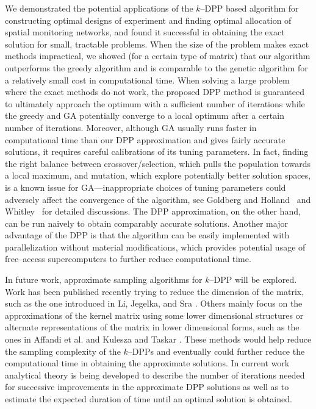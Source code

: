 \documentclass[]{interact}
\theoremstyle{plain}%
\theoremstyle{definition}
\theoremstyle{remark}
\begin{document}
We demonstrated the potential applications of the $k$--DPP based algorithm for constructing optimal designs of experiment and finding optimal allocation of spatial monitoring networks, and found it successful in obtaining the exact solution for small, tractable problems. When the size of the problem makes exact methods impractical, we showed (for a certain type of matrix) that our algorithm outperforms the greedy algorithm and is comparable to the genetic algorithm for a relatively small cost in computational time. When solving a large problem where the exact methods do not work, the proposed DPP method is guaranteed to ultimately approach the optimum with a sufficient number of iterations while the greedy and GA potentially converge to a local optimum after a certain number of iterations. Moreover, although GA usually runs faster in computational time than our DPP approximation and gives fairly accurate solutions, it requires careful calibrations of its tuning parameters. In fact, finding the right balance between crossover/selection, which pulls the population towards a local maximum, and mutation, which explore potentially better solution spaces, is a known issue for GA---inappropriate choices of tuning parameters could adversely affect the convergence of the algorithm, see Goldberg and Holland~\cite{Goldberg} and Whitley~\cite{Whitley} for detailed discussions. The DPP approximation, on the other hand, can be run naively to obtain comparably accurate solutions. Another major advantage of the DPP is that the algorithm can be easily implemented with parallelization without material modifications, which provides potential usage of free--access supercomputers to further reduce computational time.

In future work, approximate sampling algorithms for $k$--DPP will be explored. Work has been published recently trying to reduce the dimension of the matrix, such as the one introduced in Li, Jegelka, and Sra \cite{Li}. Others mainly focus on the approximations of the kernel matrix using some lower dimensional structures or alternate representations of the matrix in lower dimensional forms, such as the ones in Affandi et al. \cite{Affandi1} and Kulesza and Taskar \cite{Kulesza}. These methods would help reduce the sampling complexity of the $k$--DPPs and eventually could further reduce the computational time in obtaining the approximate solutions. In current work analytical theory is being developed to describe the number of iterations needed for successive improvements in the approximate DPP solutions as well as to estimate the expected duration of time until an optimal solution is obtained.  
\end{document}
